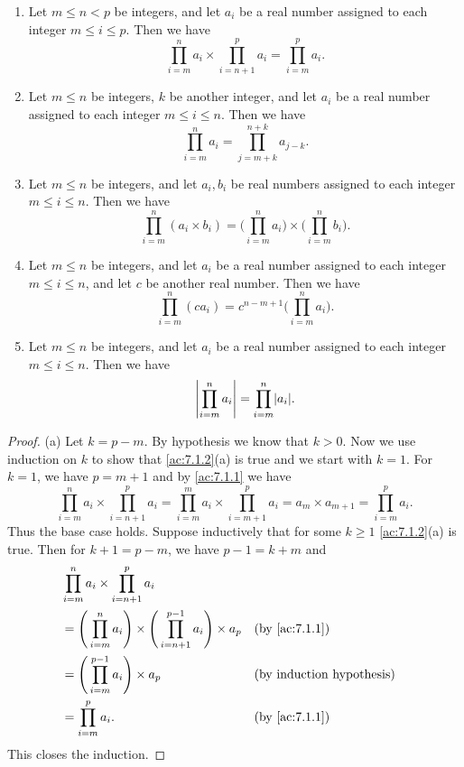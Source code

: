 \begin{ac}\label{ac:7.1.2}
  \mbox{}
  \begin{enumerate}
    \item Let \(m \leq n < p\) be integers, and let \(a_i\) be a real number assigned to each integer \(m \leq i \leq p\).
          Then we have
          \[
            \prod_{i = m}^n a_i \times \prod_{i = n + 1}^p a_i = \prod_{i = m}^p a_i.
          \]
    \item Let \(m \leq n\) be integers, \(k\) be another integer, and let \(a_i\) be a real number assigned to each integer \(m \leq i \leq n\).
          Then we have
          \[
            \prod_{i = m}^n a_i = \prod_{j = m + k}^{n + k} a_{j - k}.
          \]
    \item Let \(m \leq n\) be integers, and let \(a_i, b_i\) be real numbers assigned to each integer \(m \leq i \leq n\).
          Then we have
          \[
            \prod_{i = m}^n (a_i \times b_i) = \Bigg(\prod_{i = m}^n a_i\Bigg) \times \Bigg(\prod_{i = m}^n b_i\Bigg).
          \]
    \item Let \(m \leq n\) be integers, and let \(a_i\) be a real number assigned to each integer \(m \leq i \leq n\), and let \(c\) be another real number.
          Then we have
          \[
            \prod_{i = m}^n (ca_i) = c^{n - m + 1} \Bigg(\prod_{i = m}^n a_i\Bigg).
          \]
    \item Let \(m \leq n\) be integers, and let \(a_i\) be a real number assigned to each integer \(m \leq i \leq n\).
          Then we have
          \[
            \abs{\prod_{i = m}^n a_i} = \prod_{i = m}^n \abs{a_i}.
          \]
  \end{enumerate}
\end{ac}

\begin{proof}{(a)}
  Let \(k = p - m\).
  By hypothesis we know that \(k > 0\).
  Now we use induction on \(k\) to show that \cref{ac:7.1.2}(a) is true and we start with \(k = 1\).
  For \(k = 1\), we have \(p = m + 1\) and by \cref{ac:7.1.1} we have
  \[
    \prod_{i = m}^n a_i \times \prod_{i = n + 1}^p a_i = \prod_{i = m}^m a_i \times \prod_{i = m + 1}^p a_i = a_m \times a_{m + 1} = \prod_{i = m}^p a_i.
  \]
  Thus the base case holds.
  Suppose inductively that for some \(k \geq 1\) \cref{ac:7.1.2}(a) is true.
  Then for \(k + 1 = p - m\), we have \(p - 1 = k + m\) and
  \begin{align*}
     & \prod_{i = m}^n a_i \times \prod_{i = n + 1}^p a_i                                                                                  \\
     & = \Bigg(\prod_{i = m}^n a_i\Bigg) \times \Bigg(\prod_{i = n + 1}^{p - 1} a_i\Bigg) \times a_p &  & \text{(by \cref{ac:7.1.1})}      \\
     & = \Bigg(\prod_{i = m}^{p - 1} a_i\Bigg) \times a_p                                            &  & \text{(by induction hypothesis)} \\
     & = \prod_{i = m}^p a_i.                                                                        &  & \text{(by \cref{ac:7.1.1})}
  \end{align*}
  This closes the induction.
\end{proof}

